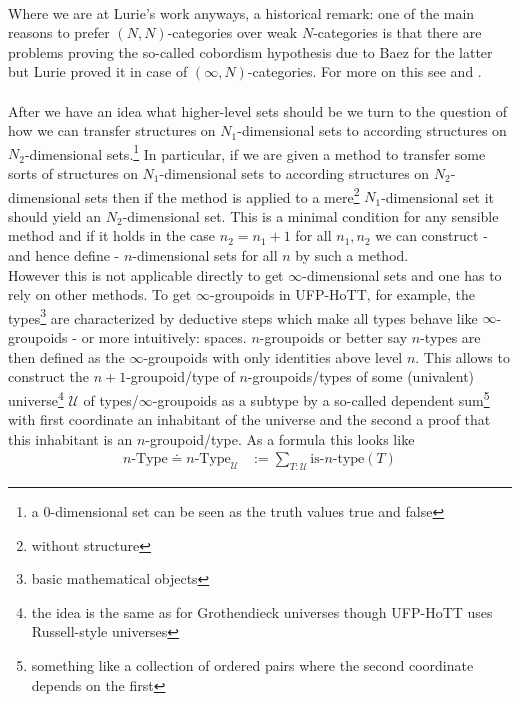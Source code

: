 \\
Where we are at Lurie's work anyways, a historical remark: one of the main reasons to prefer $(N,N)$-categories over weak $N$-categories is that there are problems proving the so-called cobordism hypothesis due to Baez for the latter but Lurie proved it in case of $(\infty,N)$-categories. For more on this see \cite{ea5d49bf} and \cite{00000011}.
\\\\
After we have an idea what higher-level sets should be we turn to the question of how we can transfer structures on $N_{1}$-dimensional sets to according structures on $N_{2}$-dimensional sets.\footnote{a $0$-dimensional set can be seen as the truth values {\glqq}true{\grqq} and {\glqq}false{\grqq}} In particular, if we are given a method to transfer some sorts of structures on $N_{1}$-dimensional sets to according structures on $N_{2}$-dimensional sets then if the method is applied to a mere\footnote{without structure} $N_{1}$-dimensional set it should yield an $N_{2}$-dimensional set. This is a minimal condition for any sensible method and if it holds in the case $n_{2} = n_{1} + 1$ for all $n_{1},n_{2}$ we can construct - and hence define - $n$-dimensional sets for all $n$ by such a method.
\\
However this is not applicable directly to get $\infty$-dimensional sets and one has to rely on other methods. To get $\infty$-groupoids in UFP-HoTT, for example, the types\footnote{basic mathematical objects} are characterized by deductive steps which make all types behave like $\infty$-groupoids - or more intuitively: spaces. $n$-groupoids or better say $n$-types are then defined as the $\infty$-groupoids with only identities above level $n$. This allows to construct the $n+1$-groupoid/type of $n$-groupoids/types of some (univalent) universe\footnote{the idea is the same as for Grothendieck universes though UFP-HoTT uses Russell-style universes} $\mathcal{U}$ of types/$\infty$-groupoids as a subtype by a so-called dependent sum\footnote{something like a collection of ordered pairs where the second coordinate depends on the first} with first coordinate an inhabitant of the universe and the second a proof that this inhabitant is an $n$-groupoid/type. As a formula this looks like
\begin{align*}
  n\textrm{-Type}
  \doteq
  n\textrm{-Type}_{\mathcal{U}}
  &:=
  \sum_{T \colon \mathcal{U}}
  \textrm{is-}n\textrm{-type}(T)
\end{align*}

